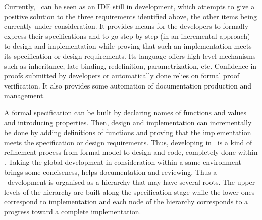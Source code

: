 Currently, \focal\  can be seen as an IDE still in development, which attempts
to give a positive solution to the three requirements identified above,
the other items being currently under consideration.
 It provides
means for the developers to formally express their specifications and
to go step by step (in an incremental approach) to design and
implementation while proving that
such an implementation meets its specification or design
requirements. Its language offers  high level
mechanisms such as inheritance, late binding, redefinition,
parametrization, etc.  Confidence in proofs submitted by developers or
automatically done 
relies on formal proof verification.  It also provides some automation of documentation
production and management. 

A formal specification can be built by declaring names of functions
and values and introducing
properties. Then, design and implementation can incrementally be done
by adding definitions of functions and proving that the implementation
meets the specification or design requirements. Thus, developing in
\focal\ is a kind of refinement process from  formal model to design
and code, completely done within \focal. Taking the global development
in consideration within a same environment brings some conciseness,
helps documentation and reviewing.
Thus a \focal\ development is organised as a hierarchy that may have
several roots. The upper levels of the hierarchy are built along the
specification stage while the lower ones correspond to
implementation and each  node of the hierarchy corresponds to a progress
toward a complete implementation. 


\bigskip

